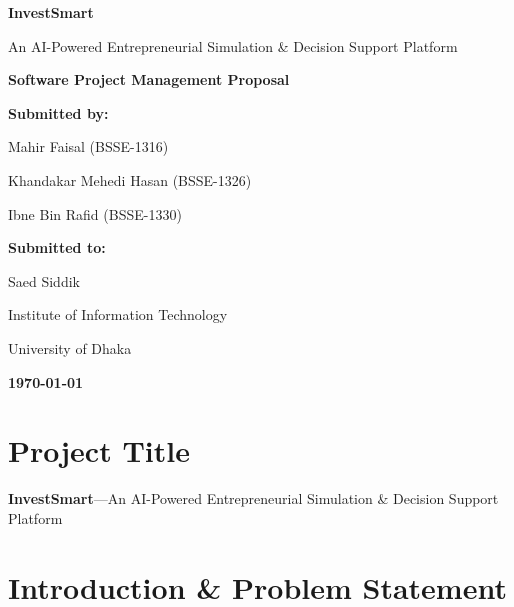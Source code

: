 \documentclass[12pt,letterpaper]{article}
\begin{document}
\begin{titlepage}
    \centering
    \vspace*{2cm}
    
    {\Huge\bfseries\color{primaryblue} InvestSmart}
    
    \vspace{0.3cm}
    {\LARGE\color{secondaryblue} An AI-Powered Entrepreneurial Simulation \& Decision Support Platform}
    
    \vspace{2cm}
    {\Large\bfseries Software Project Management Proposal}
    
    \vspace{2cm}
    {\large\bfseries Submitted by:}
    
    \vspace{0.5cm}
    {\large Mahir Faisal (BSSE-1316)}
    
    \vspace{0.3cm}
    {\large Khandakar Mehedi Hasan (BSSE-1326)}
    
    \vspace{0.3cm}
    {\large Ibne Bin Rafid (BSSE-1330)}
    
    \vspace{.5cm}
    {\large\bfseries Submitted to:}
    
    \vspace{0.2cm}
    {\large Saed Siddik}
    
    \vspace{0.2cm}
    {\large Institute of Information Technology}
    
    \vspace{0.2cm}
    {\large University of Dhaka}
    
    \vspace{.5cm}
    {\large\bfseries\today}
    
\end{titlepage}

\tableofcontents
\newpage

\section{Project Title}
\textbf{InvestSmart}—An AI-Powered Entrepreneurial Simulation \& Decision Support Platform

\section{Introduction \& Problem Statement}
\end{document}
